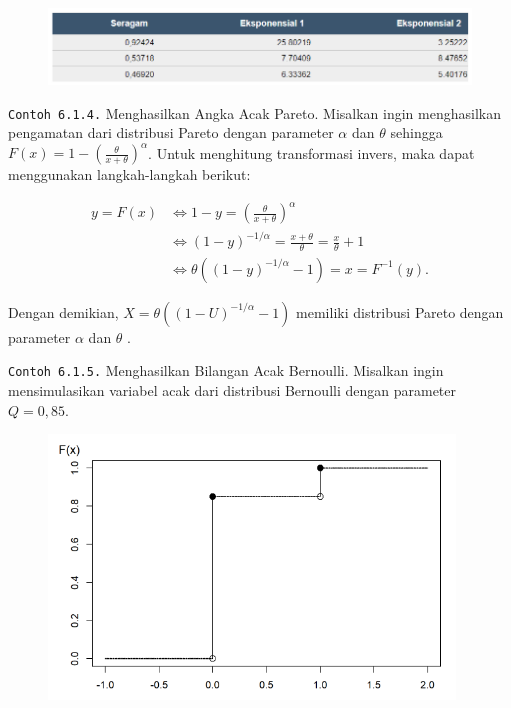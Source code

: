 \documentclass[
]{book}
\begin{document}
\begin{figure}

{\centering \includegraphics[width=1\linewidth]{images/6.1.2-1} 

}

\end{figure}

\texttt{Contoh\ 6.1.4.} Menghasilkan Angka Acak Pareto. Misalkan ingin menghasilkan pengamatan dari distribusi Pareto dengan parameter \(α\) dan \(θ\) sehingga \(F(x) = 1 - \left(\frac{\theta}{x+\theta} \right)^{\alpha}\). Untuk menghitung transformasi invers, maka dapat menggunakan langkah-langkah berikut:

\[\begin{aligned}
 y = F(x) &\Leftrightarrow 1-y = \left(\frac{\theta}{x+\theta} \right)^{\alpha} \\
  &\Leftrightarrow \left(1-y\right)^{-1/\alpha} = \frac{x+\theta}{\theta} = \frac{x}{\theta} +1 \\
    &\Leftrightarrow \theta \left((1-y)^{-1/\alpha} - 1\right) = x = F^{-1}(y) .\end{aligned}\]

Dengan demikian, \(X = \theta \left((1-U)^{-1/\alpha} - 1\right)\) memiliki distribusi Pareto dengan parameter \(α\) dan \(θ\) .

\texttt{Contoh\ 6.1.5.} Menghasilkan Bilangan Acak Bernoulli. Misalkan ingin mensimulasikan variabel acak dari distribusi Bernoulli dengan parameter \(Q= 0,85\).

\begin{figure}

{\centering \includegraphics[width=1\linewidth]{images/6.1.2-2} 

}

\end{figure}
\end{document}
